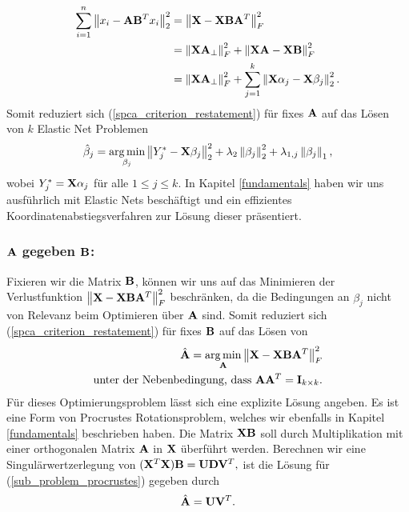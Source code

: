 \begin{align*}
\sum_{i=1}^{n} \left\lVert x_i - \mathbf{A}\mathbf{B}^Tx_i \right\rVert_2^2 & = \left\lVert \mathbf{X} - \mathbf{X} \mathbf{B} \mathbf{A}^T \right\rVert_F^{2}\\
& = \left\lVert \mathbf{X} \mathbf{A}_{\perp} \right\rVert_F^2 + \left\lVert \mathbf{X} \mathbf{A} - \mathbf{X} \mathbf{B} \right\rVert_F^2\\
& = \left\lVert \mathbf{X} \mathbf{A}_{\perp} \right\rVert_F^2 + \sum_{j=1}^{k}\left\lVert \mathbf{X} \alpha_j - \mathbf{X}\beta_j \right\rVert_2^2.
\end{align*}
Somit reduziert sich (\ref{spca_criterion_restatement}) für fixes $\mathbf{A}$ auf das Lösen von $k$ Elastic Net Problemen
\begin{align}
\label{sub_problem_enet}
\hat{\beta}_j = \operatorname*{arg\,min}_{\beta_j} \left\lVert Y_j^* - \mathbf{X} \beta_j \right\rVert_2^2 + \lambda_2 \left\lVert \beta_j \right\rVert_2^2 + \lambda_{1,j}\left\lVert \beta_j \right\rVert_1,
\end{align}
wobei $Y_j^* = \mathbf{X} \alpha_j$ für alle $1 \leq j \leq k$. In Kapitel \ref{fundamentals} haben wir uns ausführlich mit Elastic Nets beschäftigt und ein effizientes Koordinatenabstiegsverfahren zur Lösung dieser präsentiert.

\subsubsection{$\mathbf{A}$ gegeben $\mathbf{B}$:}

Fixieren wir die Matrix $\mathbf{B}$, können wir uns auf das Minimieren der Verlustfunktion $\left\lVert \mathbf{X} - \mathbf{X} \mathbf{B} \mathbf{A}^T \right\rVert_F^{2}$ beschränken, da die Bedingungen an $\beta_j$ nicht von Relevanz beim Optimieren über $\mathbf{A}$ sind. Somit reduziert sich (\ref{spca_criterion_restatement}) für fixes $\mathbf{B}$ auf das Lösen von
\begin{align}
\label{sub_problem_procrustes}
\begin{split}
\hat{\mathbf{A}} = \operatorname*{arg\,min}_{\mathbf{A}}\left\lVert \mathbf{X} - \mathbf{X} \mathbf{B} \mathbf{A}^T \right\rVert_F^2\\
\text{unter der Nebenbedingung, dass } \mathbf{A} \mathbf{A}^T = \mathbf{I}_{k \times k}.
\end{split}
\end{align}
Für dieses Optimierungsproblem lässt sich eine explizite Lösung angeben. Es ist eine Form von Procrustes Rotationsproblem, welches wir ebenfalls in Kapitel \ref{fundamentals} beschrieben haben. Die Matrix $\mathbf{X} \mathbf{B}$ soll durch Multiplikation mit einer orthogonalen Matrix $\mathbf{A}$ in $\mathbf{X}$ überführt werden. Berechnen wir eine Singulärwertzerlegung von $(\mathbf{X}^T \mathbf{X}) \mathbf{B} = \mathbf{U} \mathbf{D} \mathbf{V}^T,$ ist die Lösung für (\ref{sub_problem_procrustes}) gegeben durch
\begin{align}
\hat{\mathbf{A}} = \mathbf{U} \mathbf{V}^T.
\end{align}

